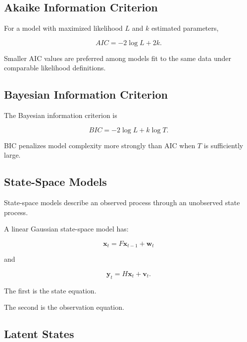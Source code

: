 \subsection{Akaike Information Criterion}
\label{subsec:time-series-aic}

For a model with maximized likelihood \(L\) and \(k\) estimated
parameters,

\[
\boxed{
AIC
=
-2\log L
+
2k.
}
\]

Smaller AIC values are preferred among models fit to the same data under
comparable likelihood definitions.

\subsection{Bayesian Information Criterion}
\label{subsec:time-series-bic}

The Bayesian information criterion is

\[
\boxed{
BIC
=
-2\log L
+
k\log T.
}
\]

BIC penalizes model complexity more strongly than AIC when \(T\) is
sufficiently large.

\subsection{State-Space Models}
\label{subsec:state-space-models}

State-space models describe an observed process through an unobserved
state process.

A linear Gaussian state-space model has:

\[
\boxed{
\mathbf{x}_t
=
F\mathbf{x}_{t-1}
+
\mathbf{w}_t
}
\]

and

\[
\boxed{
\mathbf{y}_t
=
H\mathbf{x}_t
+
\mathbf{v}_t.
}
\]

The first is the state equation.

The second is the observation equation.

\subsection{Latent States}
\label{subsec:latent-states}

